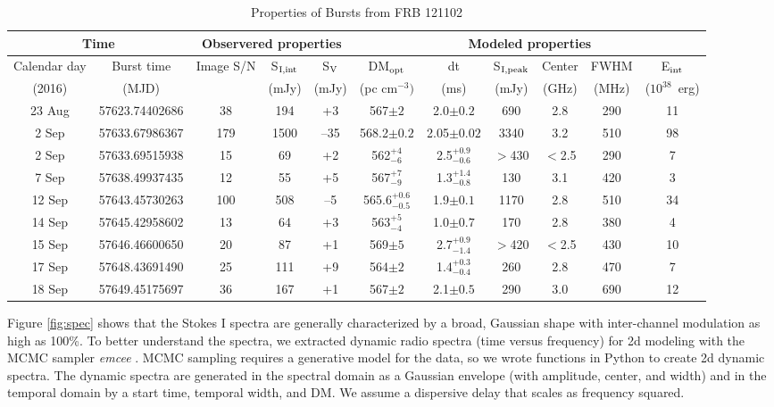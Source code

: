 \documentclass[twocolumn]{aastex61}
\newcommand{\frb}{FRB 121102}
\begin{document}
\begin{table}
\caption{Properties of Bursts from \frb}
\centering
\begin{tabular}{cc|ccc|cccccc}
\multicolumn{2}{c|}{Time} & \multicolumn{3}{c|}{Observered properties} & \multicolumn{6}{c}{Modeled properties} \\ \hline
Calendar day & Burst time   & Image S/N & S$_{\rm{I,int}}$	& S$_{\rm{V}}$ 	& DM$_{\rm{opt}}$ 	& dt 			& S$_{\rm{I,peak}}$ & Center & FWHM & E$_{\rm{int}}$ \\
(2016)       &  (MJD)     &           & (mJy) 			& (mJy) 		& (pc cm$^{-3})$ 	& (ms) 			& (mJy) 			& (GHz)  & (MHz) & ($10^{38}$\ erg)\\ \hline
23 Aug & 57623.74402686      & 38 		& 194				& +3			& 567$\pm2$ 		& 2.0$\pm0.2$	 		& 690 		& 2.8 		& 290 & 11 			\\
2 Sep & 57633.67986367      & 179 		& 1500				& --35 			& 568.2$\pm0.2$ 	& 2.05$\pm0.02$			& 3340 		& 3.2 		& 510 & 98				\\
2 Sep\tablenotemark{a} & 57633.69515938 & 15 & 69			& +2			& 562$^{+4}_{-6}$ 	& 2.5$^{+0.9}_{-0.6}$	& $>$430 	& $<$2.5	& 290 & 7  			\\
7 Sep & 57638.49937435      & 12 		& 55				& +5 			& 567$^{+7}_{-9}$ 	& 1.3$^{+1.4}_{-0.8}$	& 130 		& 3.1 		& 420 & 3  			\\
12 Sep & 57643.45730263      & 100 		& 508				& --5 			& 565.6$^{+0.6}_{-0.5}$ & 1.9$\pm0.1$		& 1170 		& 2.8 		& 510 & 34 			\\
14 Sep & 57645.42958602      & 13 		& 64 				& +3			& 563$^{+5}_{-4}$ 	& 1.0$\pm0.7$		 	& 170 		& 2.8 		& 380 & 4  			\\
15 Sep\tablenotemark{a} & 57646.46600650 & 20 & 87			& +1			& 569$\pm5$ 		& 2.7$^{+0.9}_{-1.4}$	& $>$420 	& $<$2.5 	& 430 & 10 			\\
17 Sep\tablenotemark{b} & 57648.43691490 & 25 & 111			& +9			& 564$\pm2$ 		& 1.4$^{+0.3}_{-0.4}$	& 260 		& 2.8 		& 470 & 7  			\\
18 Sep & 57649.45175697      & 36 		& 167				& +1			& 567$\pm2$ 		& 2.1$\pm0.5$		 	& 290 		& 3.0 		& 690 & 12 			\\ \hline
\end{tabular}
\label{tab:spec}
\end{table} 

Figure \ref{fig:spec} shows that the Stokes I spectra are generally characterized by a broad, Gaussian shape with inter-channel modulation as high as 100\%. To better understand the spectra, we extracted dynamic radio spectra (time versus frequency) for 2d modeling with the MCMC sampler \emph{emcee} \citep{2013PASP..125..306F}. MCMC sampling requires a generative model for the data, so we wrote functions in Python to create 2d dynamic spectra. The dynamic spectra are generated in the spectral domain as a Gaussian envelope (with amplitude, center, and width) and in the temporal domain by a start time, temporal width, and DM. We assume a dispersive delay that scales as frequency squared.
\end{document}
